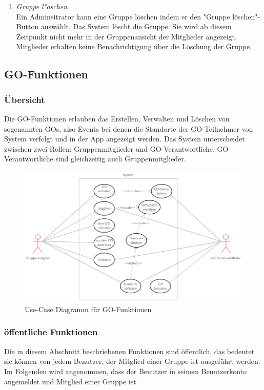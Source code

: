 \documentclass[parskip=full]{scrartcl}
\def\threedigits#1{%
  \ifnum#1<100 0\fi
  \ifnum#1<10 0\fi
  \number#1}
\begin{document}
\begin{enumerate}[label={\textbf{/F\protect\threedigits{\theenumi}0/}}, leftmargin=*, resume]
	\item \textit{Gruppe l"oschen} \\
	Ein Adminsitrator kann eine Gruppe löschen indem er den "Gruppe löschen"-Button auswählt. Das System löscht die Gruppe. Sie wird ab diesem Zeitpunkt nicht mehr in der Gruppenansicht der Mitglieder angezeigt. Mitglieder erhalten keine Benachrichtigung über die Löschung der Gruppe.
	
\end{enumerate}
	
\subsection{GO-Funktionen}

\subsubsection{Übersicht}
Die GO-Funktionen erlauben das Erstellen, Verwalten und Löschen von sogenannten GOs, also Events bei denen die Standorte der GO-Teilnehmer von System verfolgt und in der App angezeigt werden. Das System unterscheidet zwischen zwei Rollen: Gruppenmitglieder und GO-Verantwortliche. GO-Verantwortliche sind gleichzeitig auch Gruppenmitglieder.

	\begin{figure}[H]
		\centering
		\includegraphics[width=1\textwidth]{Use_Cases/use_case_GO.png}
		\caption{Use-Case Diagramm für GO-Funktionen}
	\end{figure}

 

\subsubsection{öffentliche Funktionen}
Die in diesem Abschnitt beschriebenen Funktionen sind öffentlich, das bedeutet sie können von jedem Benutzer, der Mitglied einer Gruppe ist ausgeführt werden.
Im Folgenden wird angenommen, dass der Benutzer in seinem Benutzerkonto angemeldet und Mitglied einer Gruppe ist.
\end{document}
